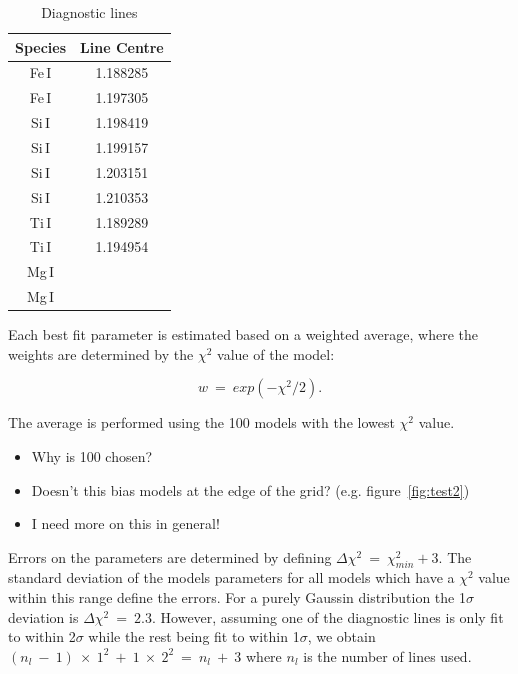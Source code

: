 \documentclass[12pt]{article}
\begin{document}
\begin{table}
\caption[Diagnostic lines]{Diagnostic lines\label{tb:lines}}
\scriptsize
\begin{center}
\begin{tabular}{cc}
 \hline
 \hline
Species & Line Centre \\
 \hline
Fe\,I & 1.188285 \\
Fe\,I & 1.197305 \\
Si\,I & 1.198419 \\
Si\,I & 1.199157 \\
Si\,I & 1.203151 \\
Si\,I & 1.210353 \\
Ti\,I & 1.189289 \\
Ti\,I & 1.194954 \\
Mg\,I & \\
Mg\,I & \\
 \hline
\end{tabular}
\end{center}
\end{table}

Each best fit parameter is estimated based on a weighted average,
where the weights are determined by the $\chi^{2}$ value of the model:

\begin{equation}
    w~=~exp(-\chi^{2}/2).
\end{equation}

The average is performed using the 100 models with the lowest $\chi^{2}$ value.
\begin{itemize}
    \item Why is 100 chosen?
    \item Doesn't this bias models at the edge of the grid? (e.g. figure~\ref{fig:test2})
    \item I need more on this in general!
\end{itemize}

Errors on the parameters are determined by defining
$\Delta\chi^{2}~=~\chi^{2}_{min} + 3$.
The standard deviation of the models parameters for all models which have a
$\chi^{2}$ value within this range define the errors.
For a purely Gaussin distribution the 1$\sigma$ deviation is $\Delta\chi^{2}~=~2.3$.
However, assuming one of the diagnostic lines is only fit to within 2$\sigma$ while the rest being fit to within 1$\sigma$, we obtain $(n_{l}~-~1)~\times~1^{2}~+~1~\times~2^{2}~=~n_{l}~+~3$
where $n_{l}$ is the number of lines used.
\end{document}
